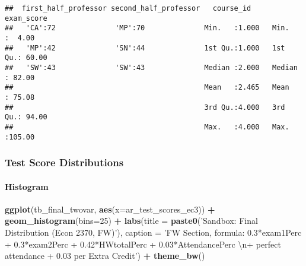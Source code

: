 \documentclass[
]{book}
\newenvironment{Shaded}{\begin{snugshade}}{\end{snugshade}}
\newcommand{\CharTok}[1]{\textcolor[rgb]{0.31,0.60,0.02}{#1}}
\newcommand{\DataTypeTok}[1]{\textcolor[rgb]{0.13,0.29,0.53}{#1}}
\newcommand{\DecValTok}[1]{\textcolor[rgb]{0.00,0.00,0.81}{#1}}
\newcommand{\KeywordTok}[1]{\textcolor[rgb]{0.13,0.29,0.53}{\textbf{#1}}}
\newcommand{\NormalTok}[1]{#1}
\newcommand{\OperatorTok}[1]{\textcolor[rgb]{0.81,0.36,0.00}{\textbf{#1}}}
\newcommand{\OtherTok}[1]{\textcolor[rgb]{0.56,0.35,0.01}{#1}}
\newcommand{\StringTok}[1]{\textcolor[rgb]{0.31,0.60,0.02}{#1}}
\begin{document}
\begin{Shaded}
\end{Shaded}

\begin{verbatim}
##  first_half_professor second_half_professor   course_id       exam_score    
##   'CA':72              'MP':70              Min.   :1.000   Min.   :  4.00  
##   'MP':42              'SN':44              1st Qu.:1.000   1st Qu.: 60.00  
##   'SW':43              'SW':43              Median :2.000   Median : 82.00  
##                                             Mean   :2.465   Mean   : 75.08  
##                                             3rd Qu.:4.000   3rd Qu.: 94.00  
##                                             Max.   :4.000   Max.   :105.00
\end{verbatim}

\hypertarget{test-score-distributions}{%
\subsubsection{Test Score Distributions}\label{test-score-distributions}}

\hypertarget{histogram-1}{%
\paragraph{Histogram}\label{histogram-1}}

\begin{Shaded}
\begin{Highlighting}[]
\KeywordTok{ggplot}\NormalTok{(tb_final_twovar, }\KeywordTok{aes}\NormalTok{(}\DataTypeTok{x=}\NormalTok{ar_test_scores_ec3)) }\OperatorTok{+}
\StringTok{  }\KeywordTok{geom_histogram}\NormalTok{(}\DataTypeTok{bins=}\DecValTok{25}\NormalTok{) }\OperatorTok{+}
\StringTok{  }\KeywordTok{labs}\NormalTok{(}\DataTypeTok{title =} \KeywordTok{paste0}\NormalTok{(}\StringTok{'Sandbox: Final Distribution (Econ 2370, FW)'}\NormalTok{),}
       \DataTypeTok{caption =} \StringTok{'FW Section, formula: 0.3*exam1Perc + 0.3*exam2Perc + 0.42*HWtotalPerc + 0.03*AttendancePerc }\CharTok{\textbackslash{}n}\StringTok{+ perfect attendance + 0.03 per Extra Credit'}\NormalTok{) }\OperatorTok{+}
\StringTok{  }\KeywordTok{theme_bw}\NormalTok{()}
\end{Highlighting}
\end{Shaded}
\end{document}
